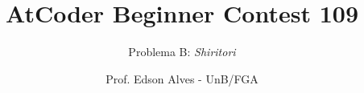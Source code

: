 \title{AtCoder Beginner Contest 109}
\subtitle{Problema B: {\it Shiritori}}
\author{Prof. Edson Alves - UnB/FGA}
\date{}
